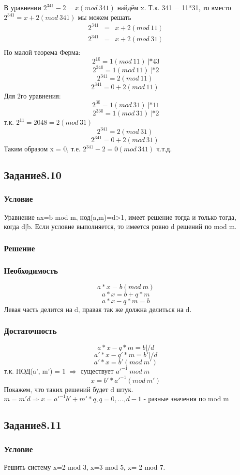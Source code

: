 \documentclass[10pt,a4paper]{article}
\begin{document}
В уравнении $ 2^{341} - 2 = x (mod\ 341) $ найдём x. Т.к. 341 = 11*31,
то вместо $ 2^{341} = x + 2 (mod\ 341) $ мы можем решать
\begin{eqnarray*}
2^{341} & = & x + 2 (mod\ 11)  \\
2^{341} & = & x + 2 (mod\ 31)  \\
\end{eqnarray*}
По малой теорема Ферма:
$$ 2^{10} = 1 (mod\ 11)\ | * 43 $$
$$ 2^{340} = 1 (mod\ 11)\ | * 2$$
$$ 2^{341} = 2 (mod\ 11)\ $$
$$ 2^{341} = 0 + 2 (mod\ 11)\ $$
Для 2го уравнения:
$$ 2^{30} = 1 (mod\ 31)\ | * 11 $$
$$ 2^{330} = 1 (mod\ 31)\ | * 2$$
т.к. $ 2^{11} = 2048 = 2 (mod\ 31) $
$$ 2^{341} = 2 (mod\ 31)\ $$
$$ 2^{341} = 0 + 2 (mod\ 31)\ $$
Таким образом x = 0, т.е.
$ 2^{341} - 2 = 0 (mod\ 341) $
ч.т.д.

\subsection*{Задание8.10}
\subsubsection*{Условие}
Уравнение ax=b mod m, нод(a,m)=d>1, имеет решение тогда и только
тогда, когда d|b. Если условие выполняется, то имеется ровно d решений
по mod m.
\subsubsection*{Решение} 
\subsubsection*{Необходимость}
$$ a*x = b (mod\ m) $$
$$ a*x = b + q*m $$
$$ a*x - q*m = b $$
Левая часть делится на d, правая так же должна делиться на d.
\subsubsection*{Достаточность}
$$ a*x - q*m = b | /d $$
$$ a'*x - q'*m = b' | /d $$
$$ a'*x = b' (mod\ m') $$
т.к. НОД(a', m') = 1 $\Rightarrow$ существует $ a'^{-1}\ mod\ m$
$$ x = b'*a'^{-1} (mod\ m') $$
Покажем, что таких решений будет d штук.
$ m = m'd \Rightarrow x = a'^{-1}b' + m'*q, q = 0,...,d-1 $ - разные
значения по mod m

\subsection*{Задание8.11}
\subsubsection*{Условие}
Решить систему x=2 mod 3, x=3 mod 5, x= 2 mod 7.
\end{document}
